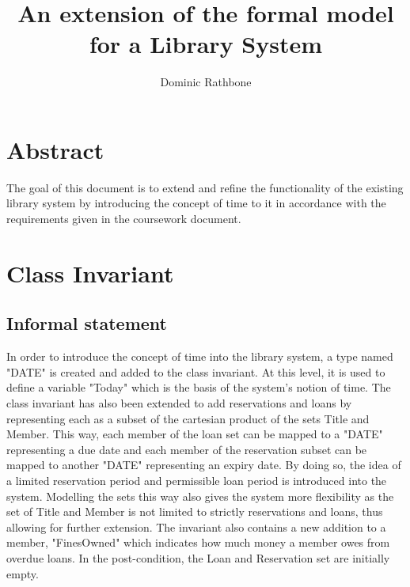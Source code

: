 \documentclass[]{report}
\title{An extension of the formal model for a Library System}
\author{Dominic Rathbone}
\begin{document}
\maketitle

\section{Abstract}
The goal of this document is to extend and refine the functionality of the existing library system by introducing the concept of time to it in accordance with the requirements given in the coursework document.

\section{Class Invariant}
\subsection{Informal statement}
In order to introduce the concept of time into the library system, a type named "DATE" is created and added to the class invariant. At this level, it is used to define a variable "Today" which is the basis of the system's notion of time. The class invariant has also been extended to add reservations and loans by representing each as a subset of the cartesian product of the sets Title and Member. This way, each member of the loan set can be mapped to a "DATE" representing a due date and each member of the reservation subset can be mapped to another "DATE" representing an expiry date. By doing so, the idea of a limited reservation period and permissible loan period is introduced into the system. Modelling the sets this way also gives the system more flexibility as the set of Title and Member is not limited to strictly reservations and loans, thus allowing for further extension. The invariant also contains a new addition to a member, "FinesOwned" which indicates how much money a member owes from overdue loans. In the post-condition, the Loan and Reservation set are initially empty.
\end{document}

